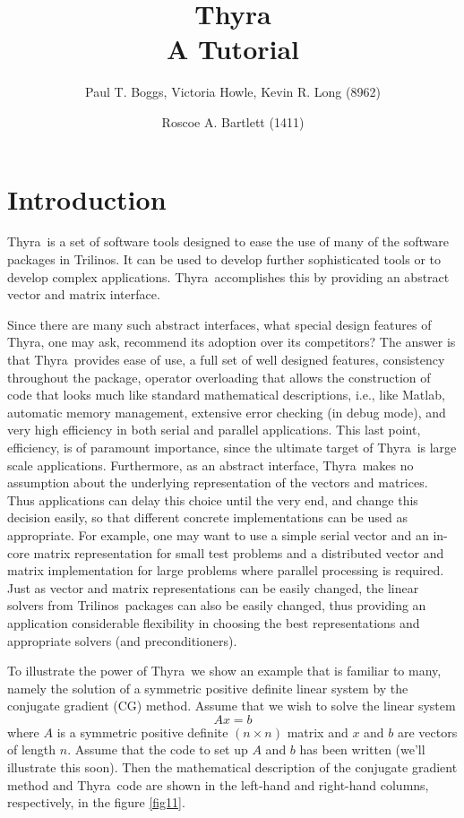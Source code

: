 \documentclass[12pt]{article}
\title{Thyra \\  A Tutorial}
\author{Paul T. Boggs, Victoria Howle, Kevin R. Long (8962)
   \and Roscoe A. Bartlett (1411)}
\newcommand{\bd}{\begin{displaymath}}
\newcommand{\ed}{\end{displaymath}}
\newcommand{\thyra}{{\sf Thyra}}
\newcommand{\tri}{{\sf Trilinos}}
\newcommand{\matlab}{{\sf Matlab}}
\begin{document}
\maketitle


\section{Introduction}

\thyra\ is a set of software tools designed to ease the use of many of
the software packages in \tri.  It can be used to develop further
sophisticated tools or to develop complex applications.  \thyra\
accomplishes this by providing an abstract vector and matrix
interface.

Since there are many such abstract interfaces, what special design
features of \thyra, one may ask,  recommend its adoption over its
competitors?   The answer
is that \thyra\ provides ease of use, a full set of well designed
features, consistency throughout the package,  operator overloading
that allows the construction of code that looks much like standard
mathematical descriptions, i.e., like \matlab,  automatic memory
management, extensive error checking (in debug mode), and very high
efficiency in both serial and parallel applications. This last point,
efficiency, is of paramount importance, since the ultimate target of
\thyra\ is large scale applications.  Furthermore, as an abstract
interface, \thyra\ makes no assumption about the underlying
representation of the vectors and matrices.  Thus applications can
delay this choice until the very end, and change this decision easily,
so that different concrete implementations can be used as
appropriate.  For example, one may want to use a simple serial vector
and an in-core matrix representation for small test problems and a
distributed vector and matrix implementation for large
problems where parallel processing is required. Just as vector and
matrix representations can be easily changed, the linear solvers from
\tri\ packages can also be easily changed, thus providing an
application considerable flexibility in choosing the best
representations and appropriate solvers (and preconditioners).

To illustrate the power of \thyra\ we show an example that is familiar
to many, namely the solution of a symmetric positive definite linear
system by the conjugate gradient (CG) method.  Assume that we wish to solve
the linear system
\bd
   Ax = b
\ed 
where $A$ is a symmetric positive definite $(n \times n)$ matrix and
$x$ and $b$ are 
vectors of length $n$.  Assume that the code to set up $A$ and $b$ has
been written (we'll illustrate this soon). Then the mathematical
description of the conjugate gradient method and \thyra\ code are
shown in the left-hand and right-hand columns, respectively, in the
figure \ref{fig11}.
\end{document}
